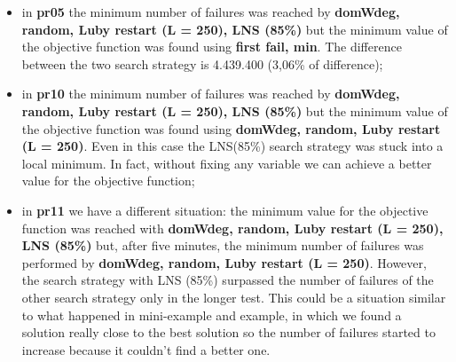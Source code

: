 \begin{itemize}
    \item in \textbf{pr05} the minimum number of failures was reached by \textbf{domWdeg, random, Luby restart (L = 250), LNS (85\%)} but the minimum value of the objective function was found using \textbf{first fail, min}. The difference between the two search strategy is 4.439.400 (3,06\% of difference);
    \item in \textbf{pr10} the minimum number of failures was reached by \textbf{domWdeg, random, Luby restart (L = 250), LNS (85\%)} but the minimum value of the objective function was found using \textbf{domWdeg, random, Luby restart (L = 250)}. Even in this case the LNS(85\%) search strategy was stuck into a local minimum. In fact, without fixing any variable we can achieve a better value for the objective function;
    \item in \textbf{pr11} we have a different situation: the minimum value for the objective function was reached with \textbf{domWdeg, random, Luby restart (L = 250), LNS (85\%)} but, after five minutes, the minimum number of failures was performed by \textbf{domWdeg, random, Luby restart (L = 250)}. However, the search strategy with LNS (85\%) surpassed the number of failures of the other search strategy only in the longer test. This could be a situation similar to what happened in mini-example and example, in which we found a solution really close to the best solution so the number of failures started to increase because it couldn't find a better one. 
\end{itemize}
